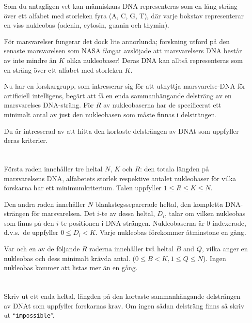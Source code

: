 \ifx\boi\undefined\fi
\def\version{jury-1}
Som du antagligen vet kan människans DNA representeras som en lång sträng över ett alfabet med storleken fyra ({A, C, G, T}), där varje bokstav representerar en viss nukleobas (adenin, cytosin, guanin och thymin).

För marsvarelser fungerar det dock lite annorlunda; forskning utförd på den senaste marsvarelsen som NASA fångat avslöjade att marsvarelsers DNA består av inte mindre än $K$ olika nukleobaser! Deras DNA kan alltså representeras som en sträng över ett alfabet med storleken $K$.

Nu har en forskargrupp, som intresserar sig för att utnyttja marsvarelse-DNA för artificiell intelligens, begärt att få en enda sammanhängande delsträng av en marsvarelses DNA-sträng. För $R$ av nukleobaserna har de specificerat 
ett minimalt antal av just den nukleobasen som måste finnas i delsträngen.

Du är intresserad av att hitta den kortaste delsträngen av DNAt som uppfyller deras kriterier.

\section*{}
Första raden innehåller tre heltal $N$, $K$ och $R$: den totala längden på marsvarelsens DNA, alfabetets storlek respektive antalet nukleobaser för vilka forskarna har ett minimumkriterium. Talen uppfyller $1 \le R \le K \le N$.

Den andra raden innehåller $N$ blankstegsseparerade heltal, den kompletta DNA-strängen för marsvarelsen. Det $i$-te av dessa heltal, $D_i$, talar om vilken nukleobas som finns på den $i$-te positionen i DNA-strängen. Nukleobaserna är $0$-indexerade, d.v.s.\ de uppfyller $0 \leq D_i < K$. Varje nukleobas förekommer åtminstone en gång.

Var och en av de följande $R$ raderna innehåller två heltal  $B$ and $Q$,  vilka anger en nukleobas och dess minimalt krävda antal.
($0 \le B < K, 1 \le Q \le N$).
Ingen nukleobas kommer att listas mer än en gång.

\section*{\outputsection}
Skriv ut ett enda heltal, längden på den kortaste sammanhängande delsträngen av DNAt som uppfyller forskarnas krav. Om ingen sådan delsträng finns så skriv ut  ``\texttt{impossible}''.

